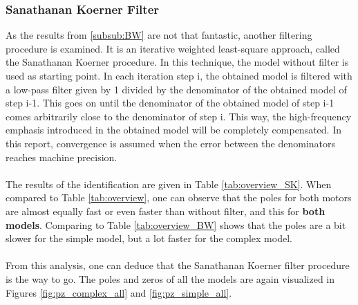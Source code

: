 \documentclass[a4paper,kul]{kulakarticle} %
\begin{document}





\subsubsection{Sanathanan Koerner Filter}

As the results from \ref{subsub:BW} are not that fantastic, another filtering procedure is examined. It is an iterative weighted least-square approach, called the Sanathanan Koerner procedure. In this technique, the model without filter is used as starting point. In each iteration step i, the obtained model is filtered with a low-pass filter given by 1 divided by the denominator of the obtained model of step i-1. This goes on until the denominator of the obtained model of step i-1 comes arbitrarily close to the denominator of step i. This way, the high-frequency emphasis introduced in the obtained model will be completely compensated. In this report, convergence is assumed when the error between the denominators reaches machine precision.
\\\\
The results of the identification are given in Table \ref{tab:overview_SK}. When compared to Table \ref{tab:overview}, one can observe that the poles for both motors are almost equally fast or even faster than without filter, and this for \textbf{both models}. Comparing to Table \ref{tab:overview_BW} shows that the poles are a bit slower for the simple model, but a lot faster for the complex model.
\\\\
From this analysis, one can deduce that the Sanathanan Koerner filter procedure is the way to go. The poles and zeros of all the models are again visualized in Figures \ref{fig:pz_complex_all} and \ref{fig:pz_simple_all}.
\end{document}
